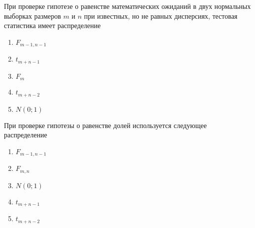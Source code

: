 \documentclass[t]{beamer}
\begin{document}
 \begin{frame} \label{5} 
\begin{block}{5} 

  При проверке гипотезе о равенстве математических ожиданий в двух нормальных выборках размеров $m$ и $n$ при известных, но не равных дисперсиях, тестовая статистика имеет распределение
  


 \end{block} 
\begin{enumerate} 
\item[] \hyperlink{5-No}{\beamergotobutton{} $F_{m-1,n-1}$}
\item[] \hyperlink{5-No}{\beamergotobutton{} $t_{m+n-1}$}
\item[] \hyperlink{5-No}{\beamergotobutton{} $F_m$}
\item[] \hyperlink{5-No}{\beamergotobutton{} $t_{m+n-2}$}
\item[] \hyperlink{5-Yes}{\beamergotobutton{} $N(0;1)$}
\end{enumerate} 
\end{frame} 


 \begin{frame} \label{6} 
\begin{block}{6} 

  При проверке гипотезы о равенстве долей используется следующее распределение
  


 \end{block} 
\begin{enumerate} 
\item[] \hyperlink{6-No}{\beamergotobutton{} $F_{m-1,n-1}$}
\item[] \hyperlink{6-No}{\beamergotobutton{} $F_{m, n}$}
\item[] \hyperlink{6-Yes}{\beamergotobutton{} $N(0;1)$}
\item[] \hyperlink{6-No}{\beamergotobutton{} $t_{m+n-1}$}
\item[] \hyperlink{6-No}{\beamergotobutton{} $t_{m+n-2}$}
\end{enumerate} 
\end{frame} 
\end{document}
